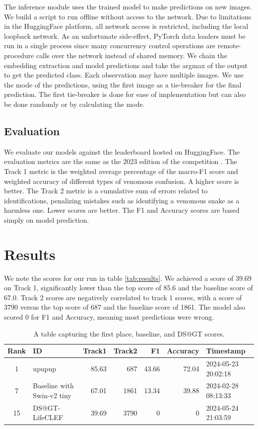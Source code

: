 \documentclass[]{ceurart}
\begin{document}
The inference module uses the trained model to make predictions on new images.
We build a script to run offline without access to the network.
Due to limitations in the HuggingFace platform, all network access is restricted, including the local loopback network.
As an unfortunate side-effect, PyTorch data loaders must be run in a single process since many concurrency control operations are remote-procedure calls over the network instead of shared memory.
We chain the embedding extraction and model predictions and take the argmax of the output to get the predicted class.
Each observation may have multiple images.
We use the mode of the predictions, using the first image as a tie-breaker for the final prediction.
The first tie-breaker is done for ease of implementation but can also be done randomly or by calculating the mode.

\subsection{Evaluation}

We evaluate our models against the leaderboard hosted on HuggingFace.
The evaluation metrics are the same as the 2023 edition of the competition \cite{joly2023overview}.
The Track 1 metric is the weighted average percentage of the macro-F1 score and weighted accuracy of different types of venomous confusion.
A higher score is better.
The Track 2 metric is a cumulative sum of errors related to identifications, penalizing mistakes such as identifying a venomous snake as a harmless one.
Lower scores are better.
The F1 and Accuracy scores are based simply on model prediction.

\section{Results}

We note the scores for our run in table \ref{tab:results}.
We achieved a score of 39.69 on Track 1, significantly lower than the top score of 85.6 and the baseline score of 67.0.
Track 2 scores are negatively correlated to track 1 scores, with a score of 3790 versus the top score of 687 and the baseline score of 1861.
The model also scored 0 for F1 and Accuracy, meaning most predictions were wrong.

\begin{table}[h!]
\centering
\label{tab:results}
\caption{
    A table capturing the first place, baseline, and DS@GT scores.
}
\begin{tabular}{|c|l|r|r|r|r|l|}
\hline
\textbf{Rank} & \textbf{ID} & \textbf{Track1} & \textbf{Track2} & \textbf{F1} & \textbf{Accuracy} & \textbf{Timestamp} \\ \hline
1 & upupup & 85.63 & 687 & 43.66 & 72.04 & 2024-05-23 20:02:18 \\ \hline
7 & Baseline with Swin-v2 tiny & 67.01 & 1861 & 13.34 & 39.88 & 2024-02-28 08:13:33 \\ \hline
15 & DS@GT-LifeCLEF & 39.69 & 3790 & 0 & 0 & 2024-05-24 21:03:59 \\ \hline
\end{tabular}
\label{tab:submission_rankings}
\end{table}
\end{document}

